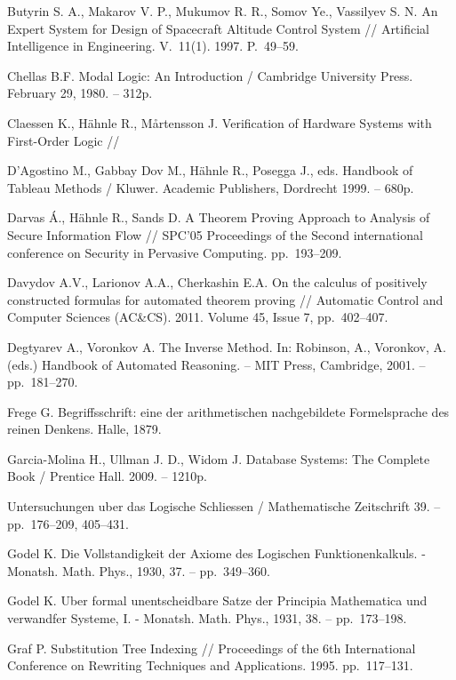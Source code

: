 \begin{thebibliography}{99}
 Butyrin S. A., Makarov V. P., Mukumov R. R., Somov Ye., Vassilyev S. N. An {E}xpert {S}ystem for {D}esign of {S}pacecraft  {A}ltitude {C}ontrol {S}ystem // Artificial Intelligence in Engineering. V.~11(1). 1997. P.~49--59.

 Chellas B.F. Modal Logic: An Introduction / Cambridge University Press. February 29, 1980. -- 312p.

 Claessen K., Hähnle R., Mårtensson J. Verification of Hardware Systems with First-Order Logic //

 D'Agostino M., Gabbay Dov M., Hähnle R., Posegga J., eds. Handbook of Tableau Methods /  Kluwer. Academic Publishers, Dordrecht 1999. -- 680p.

 Darvas Á., Hähnle R., Sands D. A Theorem Proving Approach to Analysis of Secure Information Flow // SPC'05 Proceedings of the Second international conference on Security in Pervasive Computing. pp.~193--209.

 Davydov A.V., Larionov A.A., Cherkashin E.A. On the calculus of positively constructed formulas for automated theorem proving // Automatic Control and Computer Sciences (AC\&CS). 2011. Volume 45, Issue 7, pp.~402--407.

 Degtyarev A., Voronkov A. The Inverse Method. In: Robinson, A., Voronkov, A. (eds.) Handbook of Automated Reasoning. -- MIT Press, Cambridge, 2001. -- pp.~181--270.


 Frege G. Begriffsschrift: eine der arithmetischen nachgebildete Formelsprache des reinen Denkens. Halle, 1879.

 Garcia-Molina H., Ullman J. D., Widom J. Database Systems: The Complete Book / Prentice Hall. 2009. -- 1210p.

 Untersuchungen uber das Logische Schliessen / Mathematische Zeitschrift 39. -- pp.~176--209, 405--431.


 Godel K. Die Vollstandigkeit der Axiome des Logischen Funktionenkalkuls. - Monatsh. Math. Phys., 1930, 37. -- pp.~349--360.

 Godel K. Uber formal unentscheidbare Satze der Principia Mathematica und verwandfer Systeme, I. - Monatsh. Math. Phys., 1931, 38. -- pp.~173--198.



 Graf P. Substitution Tree Indexing // Proceedings of the 6th International Conference on Rewriting Techniques and Applications. 1995. pp.~117--131.


\end{thebibliography}
